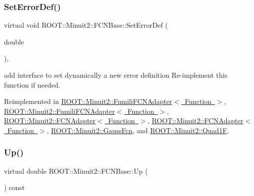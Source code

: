 \subsubsection{\texorpdfstring{SetErrorDef()}{SetErrorDef()}\hspace{0.1cm}{\footnotesize\ttfamily [2/2]}}
{\footnotesize\ttfamily virtual void R\+O\+O\+T\+::\+Minuit2\+::\+F\+C\+N\+Base\+::\+Set\+Error\+Def (\begin{DoxyParamCaption}\item[{double}]{ }\end{DoxyParamCaption})\hspace{0.3cm}{\ttfamily [inline]}, {\ttfamily [virtual]}}

add interface to set dynamically a new error definition Re-\/implement this function if needed. 

Reimplemented in \mbox{\hyperlink{classROOT_1_1Minuit2_1_1FumiliFCNAdapter_a4c854e9ce5324ee557f818ecf5f00fb1}{R\+O\+O\+T\+::\+Minuit2\+::\+Fumili\+F\+C\+N\+Adapter$<$ Function $>$}}, \mbox{\hyperlink{classROOT_1_1Minuit2_1_1FumiliFCNAdapter_a4c854e9ce5324ee557f818ecf5f00fb1}{R\+O\+O\+T\+::\+Minuit2\+::\+Fumili\+F\+C\+N\+Adapter$<$ Function $>$}}, \mbox{\hyperlink{classROOT_1_1Minuit2_1_1FCNAdapter_ad87419db3f1d4764497f52487fef6fc8}{R\+O\+O\+T\+::\+Minuit2\+::\+F\+C\+N\+Adapter$<$ Function $>$}}, \mbox{\hyperlink{classROOT_1_1Minuit2_1_1FCNAdapter_ad87419db3f1d4764497f52487fef6fc8}{R\+O\+O\+T\+::\+Minuit2\+::\+F\+C\+N\+Adapter$<$ Function $>$}}, \mbox{\hyperlink{classROOT_1_1Minuit2_1_1GaussFcn_ad6ab65c15a43f72db27fd6ddf26486f9}{R\+O\+O\+T\+::\+Minuit2\+::\+Gauss\+Fcn}}, and \mbox{\hyperlink{classROOT_1_1Minuit2_1_1Quad1F_a086ed11e56374ff0331676d7eac34395}{R\+O\+O\+T\+::\+Minuit2\+::\+Quad1F}}.

\mbox{\label{classROOT_1_1Minuit2_1_1FCNBase_a04ef08ddad92ce8d89d498efbe021c39}} 
\subsubsection{\texorpdfstring{Up()}{Up()}\hspace{0.1cm}{\footnotesize\ttfamily [1/2]}}
{\footnotesize\ttfamily virtual double R\+O\+O\+T\+::\+Minuit2\+::\+F\+C\+N\+Base\+::\+Up (\begin{DoxyParamCaption}{ }\end{DoxyParamCaption}) const\hspace{0.3cm}{\ttfamily [pure virtual]}}

